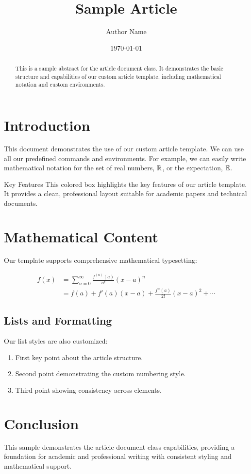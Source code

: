 \documentclass{e_class_article}
\title{Sample Article}
\author{Author Name}
\date{\today}
\begin{document}
\maketitle

\begin{abstract}
    This is a sample abstract for the article document class. It demonstrates the basic structure and capabilities of our custom article template, including mathematical notation and custom environments.
\end{abstract}

\section{Introduction}

This document demonstrates the use of our custom article template. We can use all our predefined commands and environments. For example, we can easily write mathematical notation for the set of real numbers, $\mathbb{R}$, or the expectation, $\mathbb{E}$.

\begin{callout}{Key Features}
    This colored box highlights the key features of our article template. It provides a clean, professional layout suitable for academic papers and technical documents.
\end{callout}

\section{Mathematical Content}

Our template supports comprehensive mathematical typesetting:

\begin{align}
    f(x) &= \sum_{n=0}^{\infty} \frac{f^{(n)}(a)}{n!}(x-a)^n \\
    &= f(a) + f'(a)(x-a) + \frac{f''(a)}{2!}(x-a)^2 + \cdots
\end{align}

\subsection{Lists and Formatting}

Our list styles are also customized:
\begin{enumerate}
    \item First key point about the article structure.
    \item Second point demonstrating the custom numbering style.
    \item Third point showing consistency across elements.
\end{enumerate}

\section{Conclusion}

This sample demonstrates the article document class capabilities, providing a foundation for academic and professional writing with consistent styling and mathematical support.
\end{document}

